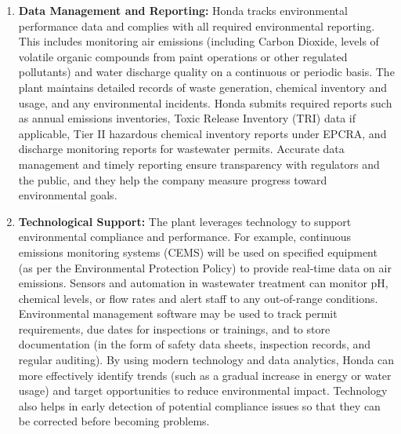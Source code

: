 \begin{enumerate}
    \item \textbf{Data Management and Reporting:} Honda tracks environmental performance data and complies with all required environmental reporting. This includes monitoring air emissions (including Carbon Dioxide, levels of volatile organic compounds from paint operations or other regulated pollutants) and water discharge quality on a continuous or periodic basis. The plant maintains detailed records of waste generation, chemical inventory and usage, and any environmental incidents. Honda submits required reports such as annual emissions inventories, Toxic Release Inventory (TRI) data if applicable, Tier II hazardous chemical inventory reports under EPCRA, and discharge monitoring reports for wastewater permits. Accurate data management and timely reporting ensure transparency with regulators and the public, and they help the company measure progress toward environmental goals.
    \item \textbf{Technological Support:} The plant leverages technology to support environmental compliance and performance. For example, continuous emissions monitoring systems (CEMS) will be used on specified equipment (as per the Environmental Protection Policy) to provide real-time data on air emissions. Sensors and automation in wastewater treatment can monitor pH, chemical levels, or flow rates and alert staff to any out-of-range conditions. Environmental management software may be used to track permit requirements, due dates for inspections or trainings, and to store documentation (in the form of safety data sheets, inspection records, and regular auditing). By using modern technology and data analytics, Honda can more effectively identify trends (such as a gradual increase in energy or water usage) and target opportunities to reduce environmental impact. Technology also helps in early detection of potential compliance issues so that they can be corrected before becoming problems.
\end{enumerate}

